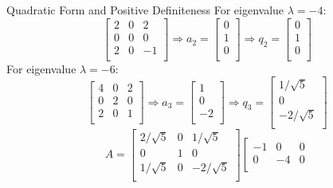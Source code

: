\documentclass{beamer}
\begin{document}
\begin{frame}{Quadratic Form and Positive Definiteness}
    For eigenvalue $\lambda = -4$:
\begin{equation*}
\left[ \begin{matrix}
	2&		0&		2\\
	0&		0&		0\\
	2&		0&		-1\\
\end{matrix} \right] \Rightarrow a_2=\left[ \begin{array}{c}
	0\\
	1\\
	0\\
\end{array} \right] \Rightarrow q_2=\left[ \begin{array}{c}
	0\\
	1\\
	0\\
\end{array} \right]
\end{equation*}
For eigenvalue $\lambda = -6$:
\begin{equation*}
    \left[ \begin{matrix}
	4&		0&		2\\
	0&		2&		0\\
	2&		0&		1\\
\end{matrix} \right] \Rightarrow a_3=\left[ \begin{array}{c}
	1\\
	0\\
	-2\\
\end{array} \right] \Rightarrow q_3=\left[ \begin{array}{c}
	1/\sqrt{5}\\
	0\\
	-2/\sqrt{5}\\
\end{array} \right]
\end{equation*}
\begin{equation*}
    A=\left[ \begin{matrix}
	2/\sqrt{5}&		0&		1/\sqrt{5}\\
	0&		1&		0\\
	1/\sqrt{5}&		0&		-2/\sqrt{5}\\
\end{matrix} \right] \left[ \begin{matrix}
	-1&		0&		0\\
	0&		-4&		0\\

\end{matrix}
\end{equation*}
\end{frame}
\end{document}
